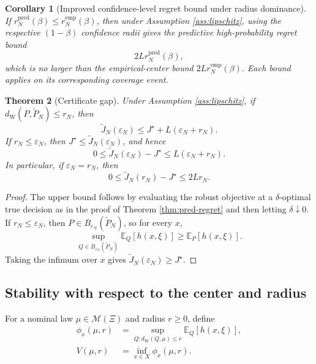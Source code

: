 \documentclass[11pt]{article}
\newtheorem{theorem}{Theorem}[section]
\newtheorem{corollary}[theorem]{Corollary}
\newcommand{\E}{\mathbb{E}}
\newcommand{\cM}{\mathcal{M}}
\newcommand{\XiSet}{\Xi}
\newcommand{\1}{\mathbf{1}}
\newcommand{\dW}{d_{\mathrm W}}
\newcommand{\Ptil}{\widetilde P_N}
\newcommand{\remp}{r_N^{\mathrm{emp}}}
\newcommand{\rpred}{r_N^{\mathrm{pred}}}
\begin{document}
\begin{corollary}[Improved confidence-level regret bound under radius dominance]\label{cor:improved-regret}
If $\rpred(\beta)\le\remp(\beta)$, then under Assumption \ref{ass:lipschitz}, using the respective $(1-\beta)$ confidence radii gives the predictive high-probability regret bound
\begin{equation}
    2L\rpred(\beta),
\end{equation}
which is no larger than the empirical-center bound $2L\remp(\beta)$. Each bound applies on its corresponding coverage event.
\end{corollary}

\begin{theorem}[Certificate gap]\label{thm:cert-gap}
Under Assumption \ref{ass:lipschitz}, if $\dW(P,\Ptil)\le r_N$, then
\begin{equation}
    \widetilde J_N(\varepsilon_N)\le J^\star+L(\varepsilon_N+r_N).
\end{equation}
If $r_N\le\varepsilon_N$, then $J^\star\le \widetilde J_N(\varepsilon_N)$, and hence
\begin{equation}
    0\le \widetilde J_N(\varepsilon_N)-J^\star\le L(\varepsilon_N+r_N).
\end{equation}
In particular, if $\varepsilon_N=r_N$, then
\begin{equation}
    0\le \widetilde J_N(r_N)-J^\star\le2Lr_N.
\end{equation}
\end{theorem}

\begin{proof}
The upper bound follows by evaluating the robust objective at a $\delta$-optimal true decision as in the proof of Theorem \ref{thm:pred-regret} and then letting $\delta\downarrow0$. If $r_N\le\varepsilon_N$, then $P\in B_{\varepsilon_N}(\Ptil)$, so for every $x$,
\begin{equation}
    \sup_{Q\in B_{\varepsilon_N}(\Ptil)}\E_Q[h(x,\xi)]\ge \E_P[h(x,\xi)].
\end{equation}
Taking the infimum over $x$ gives $\widetilde J_N(\varepsilon_N)\ge J^\star$.
\end{proof}

\subsection{Stability with respect to the center and radius}

For a nominal law $\mu\in\cM(\XiSet)$ and radius $r\ge0$, define
\begin{align}
\phi_x(\mu,r)&=\sup_{Q:\dW(Q,\mu)\le r}\E_Q[h(x,\xi)],\\
V(\mu,r)&=\inf_{x\in X}\phi_x(\mu,r).
\end{align}
\end{document}
